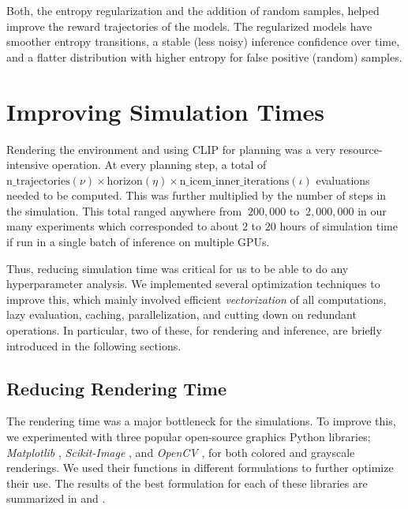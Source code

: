 Both, the entropy regularization and the addition of random samples, helped improve the reward trajectories of the models.
The regularized models have smoother entropy transitions, a stable (less noisy) inference confidence over time, and a flatter distribution with higher entropy for false positive (random) samples\footnotemark[1].




\chapter{Improving Simulation Times}
\label{sec:efficiency}
Rendering the environment and using CLIP for planning was a very resource-intensive operation.
At every planning step, a total of \(\text{n\_trajectories} (\nu) \times \text{horizon} (\eta) \times \text{n\_icem\_inner\_iterations} (\iota)\) evaluations needed to be computed.
This was further multiplied by the number of steps in the simulation.
This total ranged anywhere from \(~200,000\) to \(~2,000,000\) in our many experiments which corresponded to about \(2\) to \(20\) hours of simulation time if run in a single batch of inference on multiple GPUs.

Thus, reducing simulation time was critical for us to be able to do any hyperparameter analysis.
We implemented several optimization techniques to improve this, which mainly involved efficient \emph{vectorization} of all computations, lazy evaluation, caching, parallelization, and cutting down on redundant operations.
In particular, two of these, for rendering and inference, are briefly introduced in the following sections.

\section{Reducing Rendering Time}
\label{sec:improving-render}
The rendering time was a major bottleneck for the simulations.
To improve this, we experimented with three popular open-source graphics Python libraries; \emph{Matplotlib} \citep{matplotlib}, \emph{Scikit-Image} \citep{skimage}, and \emph{OpenCV} \citep{opencv}, for both colored and grayscale renderings.
We used their functions in different formulations to further optimize their use.
The results of the best formulation for each of these libraries are summarized in  and .\\

